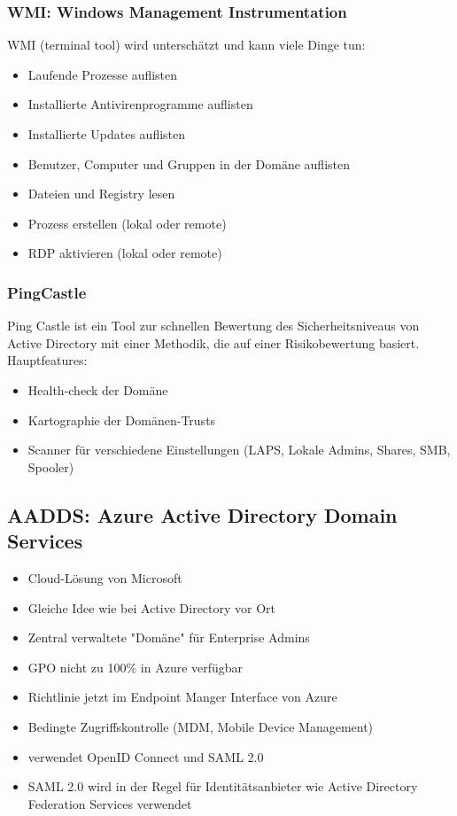 \subsubsection{WMI: Windows Management Instrumentation}
WMI (terminal tool) wird unterschätzt und kann viele Dinge tun:
\begin{itemize}
    \item Laufende Prozesse auflisten
    \item Installierte Antivirenprogramme auflisten
    \item Installierte Updates auflisten
    \item Benutzer, Computer und Gruppen in der Domäne auflisten
    \item Dateien und Registry lesen
    \item Prozess erstellen (lokal oder remote)
    \item RDP aktivieren (lokal oder remote)
\end{itemize}

\subsubsection{PingCastle}
Ping Castle ist ein Tool zur schnellen Bewertung des Sicherheitsniveaus von Active Directory mit einer Methodik, die auf einer Risikobewertung basiert. Hauptfeatures:
\begin{itemize}
    \item Health-check der Domäne
    \item Kartographie der Domänen-Trusts
    \item Scanner für verschiedene Einstellungen (LAPS, Lokale Admins, Shares, SMB, Spooler)
\end{itemize}

\subsection{AADDS: Azure Active Directory Domain Services}\label{subsec:aadds}
\begin{itemize}
    \item Cloud-Lösung von Microsoft
    \item Gleiche Idee wie bei Active Directory vor Ort
    \item Zentral verwaltete "Domäne" für Enterprise Admins
    \item GPO nicht zu 100\% in Azure verfügbar
    \item Richtlinie jetzt im Endpoint Manger Interface von Azure
    \item Bedingte Zugriffskontrolle (MDM, Mobile Device Management)
    \item verwendet OpenID Connect und SAML 2.0
    \item SAML 2.0 wird in der Regel für Identitätsanbieter wie Active Directory Federation Services verwendet
\end{itemize}


